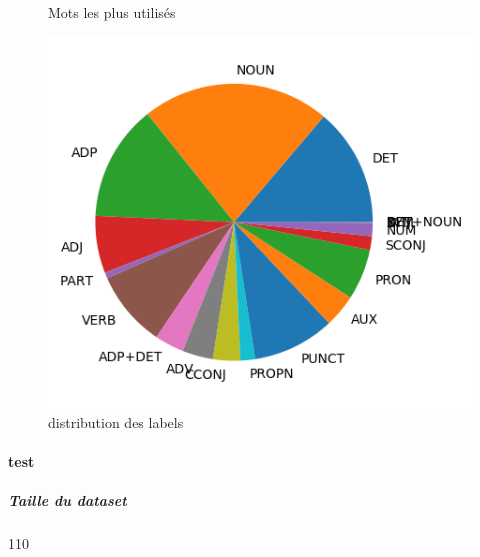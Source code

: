 \begin{figure}[H]
\begin{minipage}{0.48\textwidth}
\begin{tabular}{|l || *{11 }{|c} |}
\end{tabular}
\caption{ Mots les plus utilisés } \label{Fig:muw}\end{minipage} 
\begin{minipage}{0.48\textwidth} \centering
\label{Fig:partuttrain_img.png}
\caption{distribution des labels}\includegraphics[width=.7\linewidth]{partuttrain_img.png}

\end{minipage}
\end{figure}\paragraph{test}
\subparagraph{Taille du dataset}110
